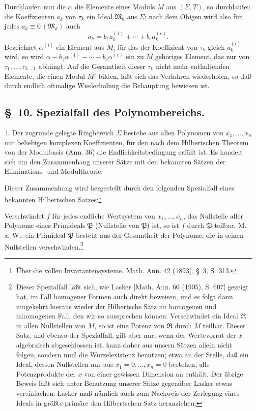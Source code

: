 \documentclass[11pt]{article}
\newcommand{\ideal}[1]{\mathfrak{#1}}
\newcommand{\eqzero}[1]{\equiv 0\,(#1)}
\begin{document}
Durchlaufen nun die $\alpha$ die Elemente eines Moduls $M$ aus $(\Sigma,T)$, so durchlaufen die Koeffizienten $a_k$ von $\tau_k$ ein Ideal $\ideal M_k$ aus $\Sigma$; nach dem Obigen wird also für jedes $a_k\eqzero{\ideal M_k}$ auch
\[
 a_k=b_1a_k^{(1)}+\cdots+b_ea_k^{(e)}.
\]
Bezeichnet $\alpha^{(i)}$ ein Element aus $M$, für das der Koeffizient von $\tau_k$ gleich $a_k^{(i)}$ wird, so wird $\alpha-b_1\alpha^{(1)}-\cdots-b_e\alpha^{(e)}$ ein zu $M$ gehöriges Element, das nur von $\tau_1,
\ldots,\tau_{k-1}$ abhängt. Auf die Gesamtheit dieser $\tau_k$ nicht mehr enthaltenden Elemente, die einen Modul $M'$ bilden, läßt sich das Verfahren wiederholen, so daß durch endlich oftmalige Wiederholung die Behauptung bewiesen ist.

\subsection*{\S~10. Spezialfall des Polynombereichs.}

1. Der zugrunde gelegte Ringbereich $\Sigma$ bestehe aus allen Polynomen von $x_1,
\ldots,x_n$ mit beliebigen komplexen Koeffizienten, für den nach dem Hilbertschen Theorem von der Modulbasis (Ann. 36) die Endlichkeitsbedingung erfüllt ist. Es handelt sich um den Zusammenhang unserer Sätze mit den bekannten Sätzen der Eliminations- und Modultheorie.

Dieser Zusammenhang wird hergestellt durch den folgenden Spezialfall eines bekannten Hilbertschen Satzes:\footnote{Über die vollen Invariantensysteme. Math. Ann. 42 (1893), \S~3, S. 313.}

Verschwindet $f$ für jedes endliche Wertsystem von $x_1,
\ldots,x_n$, das Nullstelle aller Polynome eines Primideals $\ideal P$ (Nullstelle von $\ideal P$) ist, so ist $f$ durch $\ideal P$ teilbar. M. a. W.: ein Primideal $\ideal P$ besteht aus der Gesamtheit der Polynome, die in seinen Nullstellen verschwinden.\footnote{Dieser Spezialfall läßt sich, wie Lasker [Math. Ann. 60 (1905), S. 607] gezeigt hat, im Fall homogener Formen auch direkt beweisen, und es folgt dann umgekehrt hieraus wieder der Hilbertsche Satz im homogenen und inhomogenen Fall, den wir so aussprechen können: Verschwindet ein Ideal $\ideal R$ in allen Nullstellen von $M$, so ist eine Potenz von $\ideal R$ durch $M$ teilbar. Dieser Satz, und ebenso der Spezialfall, gilt aber nur, wenn der Wertevorrat der $x$ algebraisch abgeschlossen ist, kann daher aus unsern Sätzen allein nicht folgen, sondern muß die Wurzelexistenz benutzen; etwa an der Stelle, daß ein Ideal, dessen Nullstellen nur aus $x_1=0,
\ldots,x_n=0$ bestehen, alle Potenzprodukte der $x$ von einer gewissen Dimension an enthält. Der übrige Beweis läßt sich unter Benutzung unserer Sätze gegenüber Lasker etwas vereinfachen. Lasker muß nämlich auch zum Nachweis der Zerlegung eines Ideals in größte primäre den Hilbertschen Satz heranziehen.}
\end{document}
